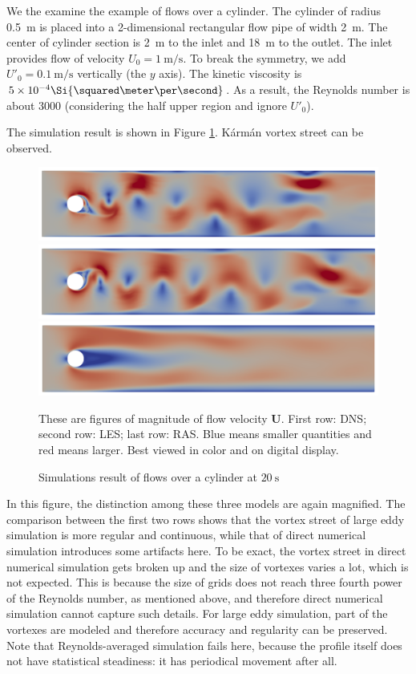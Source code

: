 \documentclass[english, nochinese]{pkupaper}
\begin{document}
We the examine the example of flows over a cylinder. The cylinder of radius \SI{0.5}{\meter} is placed into a 2-dimensional rectangular flow pipe of width \SI{2}{\meter}. The center of cylinder section is \SI{2}{\meter} to the inlet and \SI{18}{\meter} to the outlet. The inlet provides flow of velocity $ U_0 = \SI{1}{\meter\per\second} $. To break the symmetry, we add $ U'_0 = \SI{0.1}{\meter\per\second} $ vertically (the $y$ axis). The kinetic viscosity is $ 5 \times 10^{-4} \Si{\squared\meter\per\second} $. As a result, the Reynolds number is about 3000 (considering the half upper region and ignore $U'_0$).

The simulation result is shown in Figure \ref{Fig:Cyl}. K\'arm\'an vortex street can be observed.

\begin{figure}[htbp]
{
\centering
{
\includegraphics[width=15cm]{Results/Figure03a.png}
\includegraphics[width=15cm]{Results/Figure03b.png}
\includegraphics[width=15cm]{Results/Figure03c.png}
}
\caption{Simulations result of flows over a cylinder at $\SI{20}{\second}$}
\label{Fig:Cyl}
}
{
\footnotesize
These are figures of magnitude of flow velocity $\mathbf{U}$. First row: DNS; second row: LES; last row: RAS. Blue means smaller quantities and red means larger. Best viewed in color and on digital display.
}
\end{figure}

In this figure, the distinction among these three models are again magnified. The comparison between the first two rows shows that the vortex street of large eddy simulation is more regular and continuous, while that of direct numerical simulation introduces some artifacts here. To be exact, the vortex street in direct numerical simulation gets broken up and the size of vortexes varies a lot, which is not expected. This is because the size of grids does not reach three fourth power of the Reynolds number, as mentioned above, and therefore direct numerical simulation cannot capture such details. For large eddy simulation, part of the vortexes are modeled and therefore accuracy and regularity can be preserved. Note that Reynolds-averaged simulation fails here, because the profile itself does not have statistical steadiness: it has periodical movement after all.
\end{document}
